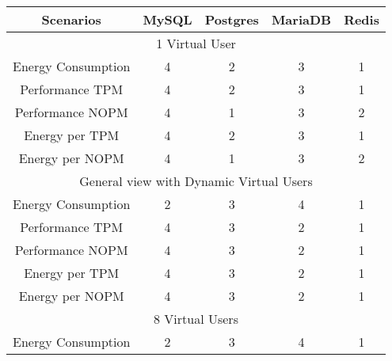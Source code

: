 \begin{table}[H]
\begin{tabular}{|c|c|c|c|c|}
\hline
Scenarios          & \multicolumn{1}{l|}{MySQL} & \multicolumn{1}{l|}{Postgres} & \multicolumn{1}{l|}{MariaDB} & Redis \\ \hline
\multicolumn{5}{|c|}{1 Virtual User}                                                                                   \\ \hline
Energy Consumption & 4                          & 2                             & 3                            & 1     \\ \hline
Performance TPM    & 4                          & 2                             & 3                            & 1     \\ \hline
Performance NOPM   & 4                          & 1                             & 3                            & 2     \\ \hline
Energy per TPM     & 4                          & 2                             & 3                            & 1     \\ \hline
Energy per NOPM    & 4                          & 1                             & 3                            & 2     \\ \hline
\multicolumn{5}{|c|}{General view with Dynamic Virtual Users}                                                          \\ \hline
Energy Consumption & 2                          & 3                             & 4                            & 1     \\ \hline
Performance TPM    & 4                          & 3                             & 2                            & 1     \\ \hline
Performance NOPM   & 4                          & 3                             & 2                            & 1     \\ \hline
Energy per TPM     & 4                          & 3                             & 2                            & 1     \\ \hline
Energy per NOPM    & 4                          & 3                             & 2                            & 1     \\ \hline
\multicolumn{5}{|c|}{8 Virtual Users}                                                                                  \\ \hline
Energy Consumption & 2                          & 3                             & 4                            & 1     \\ \hline

\end{tabular}
\end{table}
